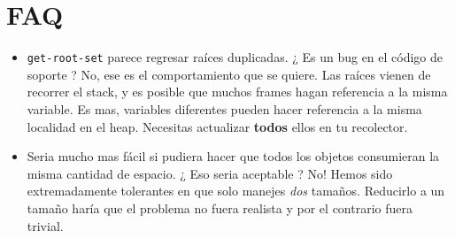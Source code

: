 \documentclass{article}
\begin{document}
\section*{FAQ}

\begin{itemize}
\item \verb;get-root-set; parece regresar raíces duplicadas. ¿ Es un bug en el código de soporte ? No,
  ese es el comportamiento que se quiere. Las raíces vienen de recorrer el stack, y es posible que muchos frames
  hagan referencia a la misma variable. Es mas, variables diferentes pueden hacer referencia a la misma localidad
  en el heap. Necesitas actualizar \textbf{todos} ellos en tu recolector.
\item Seria mucho mas fácil si pudiera hacer que todos los objetos consumieran la misma cantidad de espacio. ¿ Eso seria aceptable ? No! Hemos sido extremadamente tolerantes en que solo manejes \textit{dos} tamaños. Reducirlo
  a un tamaño haría que el problema no fuera realista y por el contrario fuera trivial.
\end{itemize}
\end{document}
